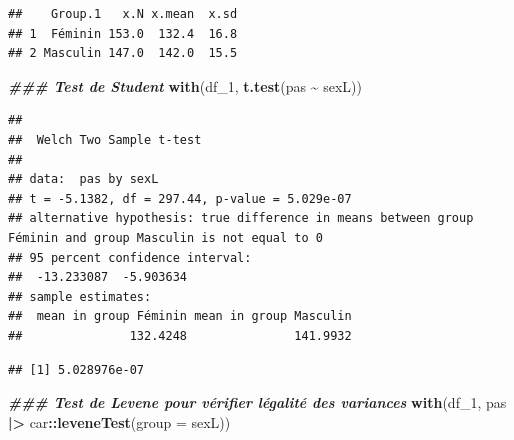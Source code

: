 \documentclass[
]{book}
\newenvironment{Shaded}{\begin{snugshade}}{\end{snugshade}}
\newcommand{\AttributeTok}[1]{\textcolor[rgb]{0.13,0.29,0.53}{#1}}
\newcommand{\CommentTok}[1]{\textcolor[rgb]{0.56,0.35,0.01}{\textit{#1}}}
\newcommand{\DocumentationTok}[1]{\textcolor[rgb]{0.56,0.35,0.01}{\textbf{\textit{#1}}}}
\newcommand{\FunctionTok}[1]{\textcolor[rgb]{0.13,0.29,0.53}{\textbf{#1}}}
\newcommand{\NormalTok}[1]{#1}
\newcommand{\SpecialCharTok}[1]{\textcolor[rgb]{0.81,0.36,0.00}{\textbf{#1}}}
\begin{document}
\begin{verbatim}
##    Group.1   x.N x.mean  x.sd
## 1  Féminin 153.0  132.4  16.8
## 2 Masculin 147.0  142.0  15.5
\end{verbatim}

\begin{Shaded}
\begin{Highlighting}[]
\DocumentationTok{\#\#\# Test de Student}
\FunctionTok{with}\NormalTok{(df\_1,}
     \FunctionTok{t.test}\NormalTok{(pas }\SpecialCharTok{\textasciitilde{}}\NormalTok{ sexL)) }
\end{Highlighting}
\end{Shaded}

\begin{verbatim}
## 
##  Welch Two Sample t-test
## 
## data:  pas by sexL
## t = -5.1382, df = 297.44, p-value = 5.029e-07
## alternative hypothesis: true difference in means between group Féminin and group Masculin is not equal to 0
## 95 percent confidence interval:
##  -13.233087  -5.903634
## sample estimates:
##  mean in group Féminin mean in group Masculin 
##               132.4248               141.9932
\end{verbatim}

\begin{Shaded}
\end{Shaded}

\begin{verbatim}
## [1] 5.028976e-07
\end{verbatim}

\begin{Shaded}
\begin{Highlighting}[]
\DocumentationTok{\#\#\# Test de Levene pour vérifier l\textquotesingle{}égalité des variances}
\FunctionTok{with}\NormalTok{(df\_1,}
\NormalTok{     pas }\SpecialCharTok{|\textgreater{}}\NormalTok{ car}\SpecialCharTok{::}\FunctionTok{leveneTest}\NormalTok{(}\AttributeTok{group =}\NormalTok{ sexL))}
\end{Highlighting}
\end{Shaded}
\end{document}
